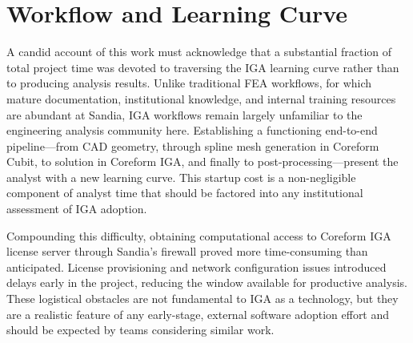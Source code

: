 \documentclass[12pt,report,justified]{SANDreport}
\begin{document}

\section{Workflow and Learning Curve}

A candid account of this work must acknowledge that a substantial fraction of total
project time was devoted to traversing the IGA learning curve rather than to producing
analysis results.  Unlike traditional FEA workflows, for which mature documentation,
institutional knowledge, and internal training resources are abundant at Sandia, IGA
workflows remain largely unfamiliar to the engineering analysis community here.  
Establishing a functioning end-to-end pipeline---from CAD geometry, through spline mesh
generation in Coreform Cubit, to solution in Coreform IGA, and finally to
post-processing---present the analyst with a new learning curve.  This startup cost
is a non-negligible component of analyst time that should be factored into any
institutional assessment of IGA adoption.

Compounding this difficulty, obtaining computational access to Coreform IGA license server through Sandia's firewall proved more time-consuming than anticipated.  License
provisioning and network configuration issues introduced delays early in the project,
reducing the window available for productive analysis.  These logistical obstacles are
not fundamental to IGA as a technology, but they are a realistic feature of any
early-stage, external software adoption effort and should be expected by teams considering similar work.
\end{document}
